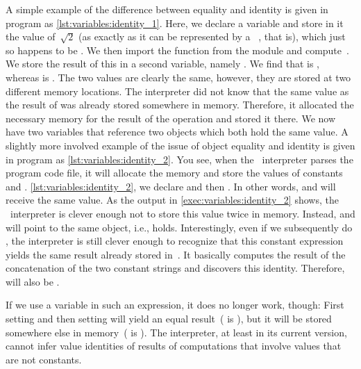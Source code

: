 A simple example of the difference between equality and identity is given in program  as \cref{lst:variables:identity_1}.
Here, we declare a  variable and store in it the value of~$\sqrt{2}$ (as exactly as it can be represented by a \python\ , that is), which just so happens to be .
We then import the function  from the  module and compute~.
We store the result of this in a second variable, namely .
We find that  is , whereas  is .
The two values are clearly the same, however, they are stored at two different memory locations.
The interpreter did not know that the same value as the result of  was already stored somewhere in memory.
Therefore, it allocated the necessary memory for the result of the  operation and stored it there.
We now have two variables that reference two objects which both hold the same value.%
%
%
%
A slightly more involved example of the issue of object equality and identity is given in program  as \cref{lst:variables:identity_2}.
You see, when the \python\ interpreter parses the program code file, it will allocate the memory and store the values of constants and .
\cref{lst:variables:identity_2}, we declare  and then .
In other words,  and  will receive the same value.
As the output in \cref{exec:variables:identity_2} shows, the \python\ interpreter is clever enough not to store this value twice in memory.
Instead,  and  will point to the same object, i.e.,  holds.
Interestingly, even if we subsequently do , the interpreter is still clever enough to recognize that this constant expression yields the same result already stored in~.
It basically computes the result of the concatenation of the two constant strings and discovers this identity.
Therefore,  will also be .

If we use a variable in such an expression, it does no longer work, though:
First setting  and then setting  will yield an equal result~( is ), but it will be stored somewhere else in memory~( is ).
The interpreter, at least in its current version, cannot infer value identities of results of computations that involve values that are not constants.

